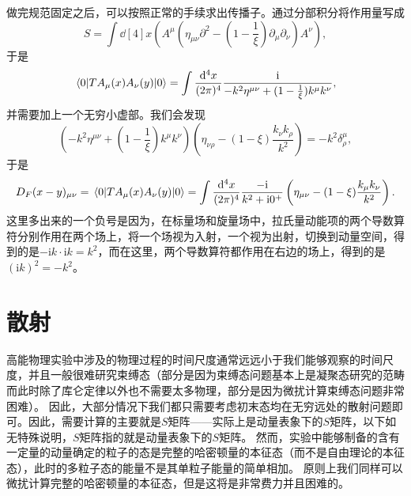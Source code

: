 \documentclass[hyperref, UTF8, a4paper]{ctexart}
\newcommand*{\ii}{\mathrm{i}}
\begin{document}
做完规范固定之后，可以按照正常的手续求出传播子。通过分部积分将作用量写成
\[
    S = \int \dd[4]{x} (A^\mu (\eta_{\mu \nu} \partial^2 - (1 - \frac{1}{\xi}) \partial_\mu \partial_\nu) A^\nu),
\]
于是
\[
    \mel{0}{T A_\mu(x) A_\nu(y)}{0} = \int \frac{\dd[4]{x}}{(2\pi)^4} \frac{\ii}{-k^2 \eta^{\mu \nu} + (1 - \frac{1}{\xi}) k^\mu k^\nu},
\]
并需要加上一个无穷小虚部。我们会发现
\[
    \left( -k^2 \eta^{\mu \nu} + (1 - \frac{1}{\xi}) k^\mu k^\nu \right) \left(\eta_{\nu \rho} - (1 - \xi) \frac{k_\nu k_\rho}{k^2} \right) = - k^2 \delta^\mu_\rho,
\]
于是
\begin{equation}
    D_F(x - y)_{\mu \nu} = \mel*{0}{T A_\mu(x) A_\nu(y)}{0} = \int \frac{\dd[4]{x}}{(2\pi)^4} \frac{-\ii}{k^2 + \ii 0^+} \left( \eta_{\mu \nu} - (1 - \xi) \frac{k_\mu k_\nu}{k^2} \right).
\end{equation}
这里多出来的一个负号是因为，在标量场和旋量场中，拉氏量动能项的两个导数算符分别作用在两个场上，将一个场视为入射，一个视为出射，切换到动量空间，得到的是$- \ii k \cdot \ii k = k^2$，而在这里，两个导数算符都作用在右边的场上，得到的是$(\ii k)^2=-k^2$。

\section{散射}

高能物理实验中涉及的物理过程的时间尺度通常远远小于我们能够观察的时间尺度，并且一般很难研究束缚态（部分是因为束缚态问题基本上是凝聚态研究的范畴而此时除了库仑定律以外也不需要太多物理，部分是因为微扰计算束缚态问题非常困难）。
因此，大部分情况下我们都只需要考虑初末态均在无穷远处的散射问题即可。因此，需要计算的主要就是$S$矩阵——实际上是动量表象下的$S$矩阵，以下如无特殊说明，$S$矩阵指的就是动量表象下的$S$矩阵。
然而，实验中能够制备的含有一定量的动量确定的粒子的态是完整的哈密顿量的本征态（而不是自由理论的本征态），此时的多粒子态的能量不是其单粒子能量的简单相加。
原则上我们同样可以微扰计算完整的哈密顿量的本征态，但是这将是非常费力并且困难的。
\end{document}
